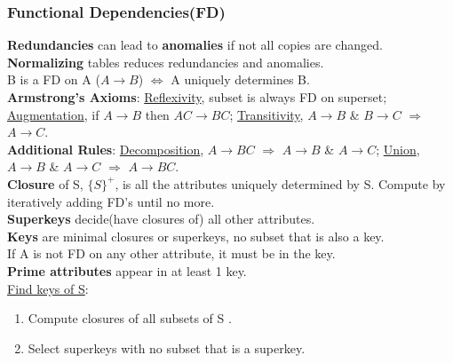 \begin{multicols*}{3}
\subsubsection{Functional Dependencies(FD)}
\textbf{Redundancies} can lead to \textbf{anomalies} if not all copies are changed.\\
\textbf{Normalizing} tables reduces redundancies and anomalies.\\
B is a FD on A ($A\rightarrow B$) $\Leftrightarrow$ A uniquely determines B.\\
\textbf{Armstrong's Axioms}: \underline{Reflexivity}, subset is always FD on superset; \underline{Augmentation}, if $A\rightarrow B$ then $AC\rightarrow BC$; \underline{Transitivity}, $A\rightarrow B$ \& $B\rightarrow C$ $\Rightarrow$ $A\rightarrow C$.\\
\textbf{Additional Rules}: \underline{Decomposition}, $A\rightarrow BC$ $\Rightarrow$ $A\rightarrow B$ \& $A\rightarrow C$; \underline{Union},  $A\rightarrow B$ \& $A\rightarrow C$ $\Rightarrow$ $A\rightarrow BC$.\\
\textbf{Closure} of S, $\{S\}^+$, is all the attributes uniquely determined by S. Compute by iteratively adding FD's until no more.\\
\textbf{Superkeys} decide(have closures of) all other attributes.\\
\textbf{Keys} are minimal closures or superkeys, no subset that is also a key.\\
If A is not FD on any other attribute, it must be in the key.\\
\textbf{Prime attributes} appear in at least 1 key.\\ 
\underline{Find keys of S}: 
\begin{enumerate}[leftmargin=*]
    \item Compute closures of all subsets of S .
    \item Select superkeys with no subset that is a superkey.\\
\end{enumerate}


\end{multicols*}
